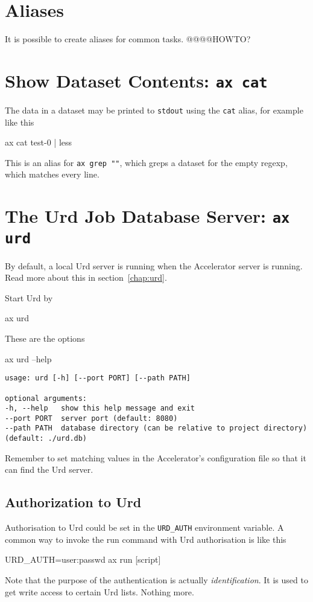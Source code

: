 \section{Aliases}
It is possible to create aliases for common tasks.
@@@@HOWTO?


\section{Show Dataset Contents: \texttt{ax cat}}
The data in a dataset may be printed to \texttt{stdout} using the
\texttt{cat} alias, for example like this
\begin{shell}
ax cat test-0 | less
\end{shell}
This is an alias for \texttt{ax grep ""}, which greps a dataset for the
empty regexp, which matches every line.





\section{The Urd Job Database Server: \texttt{ax urd}}
By default, a local Urd server is running when the Accelerator server
is running.  Read more about this in section~\ref{chap:urd}.

Start Urd by
\begin{shell}
ax urd
\end{shell}
These are the options
\begin{shell}
ax urd --help
\end{shell}
\begin{snugshade}
\begin{verbatim}
usage: urd [-h] [--port PORT] [--path PATH]

optional arguments:
-h, --help   show this help message and exit
--port PORT  server port (default: 8080)
--path PATH  database directory (can be relative to project directory)
(default: ./urd.db)
\end{verbatim}
\end{snugshade}
Remember to set matching values in the Accelerator's configuration
file so that it can find the Urd server.


\subsection{Authorization to Urd}
Authorisation to Urd could be set in the \texttt{URD\_AUTH}
environment variable.  A common way to invoke the run command with Urd
authorisation is like this
\begin{shell}
URD_AUTH=user:passwd ax run [script]
\end{shell}
Note that the purpose of the authentication is
actually \textsl{identification}.  It is used to get write access to
certain Urd lists.  Nothing more.


